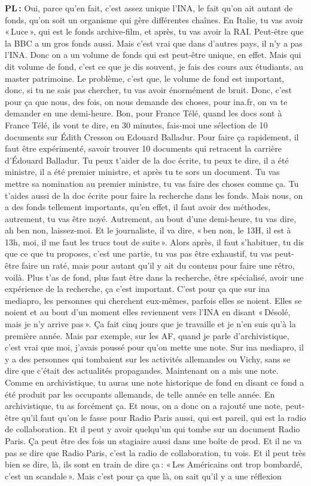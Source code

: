 \textbf{PL :} Oui, parce qu'en fait, c'est assez unique l'INA, le fait qu'on ait autant de fonds, qu'on soit un organisme qui gère différentes chaînes. En Italie, tu vas avoir « Luce », qui est le fonds archive-film, et après, tu vas avoir la RAI. Peut-être que la BBC a un gros fonds aussi. Mais c'est vrai que dans d'autres pays, il n'y a pas l'INA. Donc on a un volume de fonds qui est peut-être unique, en effet. Mais qui dit volume de fond, c'est ce que je dis souvent, je fais des cours aux étudiants, au master patrimoine. Le problème, c'est que, le volume de fond est important, donc, si tu ne sais pas chercher, tu vas avoir énormément de bruit. Donc, c'est pour ça que nous, des fois, on nous demande des choses, pour ina.fr, on va te demander en une demi-heure. Bon, pour France Télé, quand les docs sont à France Télé, ils vont te dire, en 30 minutes, fais-moi une sélection de 10 documents sur Édith Cresson ou Edouard Balladur. Pour faire ça rapidement, il faut être expérimenté, savoir trouver 10 documents qui retracent la carrière d'Édouard Balladur. Tu peux t'aider de la doc écrite, tu peux te dire, il a été ministre, il a été premier ministre, et après tu te sors un document. Tu vas mettre sa nomination au premier ministre, tu vas faire des choses comme ça. Tu t'aides aussi de la doc écrite pour faire la recherche dans les fonds. Mais nous, on a des fonds tellement importants, qu'en effet, il faut avoir des méthodes, autrement, tu vas être noyé. Autrement, au bout d'une demi-heure, tu vas dire, ah ben non, laissez-moi. Et le journaliste, il va dire, « ben non, le 13H, il est à 13h, moi, il me faut les trucs tout de suite ».  Alors après, il faut s'habituer, tu dis que ce que tu proposes, c'est une partie, tu vas pas être exhaustif, tu vas peut-être faire un raté, mais pour autant qu'il y ait du contenu pour faire une rétro, voilà.  Plus t'as de fond, plus faut être dans la recherche, être spécialisé, avoir une expérience de la recherche, ça c'est important. C'est pour ça que sur ina mediapro, les personnes qui cherchent eux-mêmes, parfois elles se noient. Elles se noient et au bout d'un moment elles reviennent vers l'INA en disant « Désolé, mais je n'y arrive pas ».  Ça fait cinq jours que je travaille et je n'en suis qu'à la première année. Mais par exemple, sur les AF, quand je parle d'archivistique, c'est vrai que moi, j'avais poussé pour qu'on mette une note. Sur ina mediapro, il y a des personnes qui tombaient sur les activités allemandes ou Vichy, sans se dire que c'était des actualités propagandes. Maintenant on a mis une note. Comme en archivistique, tu auras une note historique de fond en disant ce fond a été produit par les occupants allemands, de telle année en telle année.  En archivistique, tu as forcément ça. Et nous, on a donc on a rajouté une note, peut-être qu'il faut qu'on le fasse pour Radio Paris aussi, qui est pareil, qui est la radio de collaboration. Et il peut y avoir quelqu'un qui tombe sur un document Radio Paris. Ça peut être des fois un stagiaire aussi dans une boîte de prod.  Et il ne va pas se dire que Radio Paris, c'est la radio de collaboration, tu vois. Et il peut très bien se dire, là, ils sont en train de dire ça : « Les Américains ont trop bombardé, c'est un scandale ».  Mais c'est pour ça que là, on sait qu'il y a une réflexion 